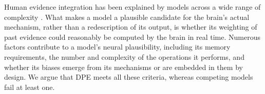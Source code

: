 \begin{ms}
Human evidence integration has been explained by models across a wide range of complexity \citep{gallistel2014perception, zhu2020bayesian, degroot1974reaching, parpart2018heuristics, raviv2012recent, usher2001time, glaze2015normative, piray2021model, zhang2014sequential, cain2012computational, gibson1997learning, waskom2018decision, kopec2024integrate, prat2024imprecise}. What makes a model a plausible candidate for the brain's actual mechanism, rather than a redescription of its output, is whether its weighting of past evidence could reasonably be computed by the brain in real time. Numerous factors contribute to a model's neural plausibility, including its memory requirements, the number and complexity of the operations it performs, and whether its biases emerge from its mechanisms or are embedded in them by design. We argue that DPE meets all these criteria, whereas competing models fail at least one.


\end{ms}
